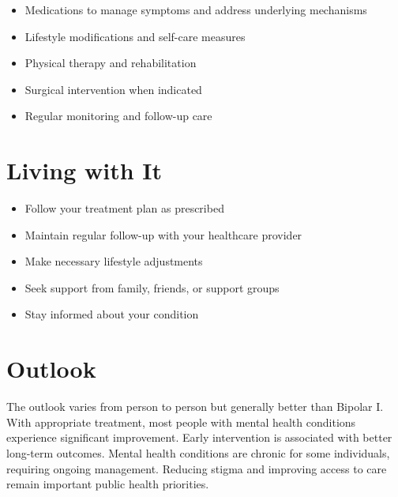 \begin{itemize}[noitemsep]
  \item Medications to manage symptoms and address underlying mechanisms
  \item Lifestyle modifications and self-care measures
  \item Physical therapy and rehabilitation
  \item Surgical intervention when indicated
  \item Regular monitoring and follow-up care
\end{itemize}
\section{Living with It}
\begin{itemize}[noitemsep]
  \item Follow your treatment plan as prescribed
  \item Maintain regular follow-up with your healthcare provider
  \item Make necessary lifestyle adjustments
  \item Seek support from family, friends, or support groups
  \item Stay informed about your condition
\end{itemize}
\section{Outlook}
The outlook varies from person to person but generally better than Bipolar I. With appropriate treatment, most people with mental health conditions experience significant improvement. Early intervention is associated with better long-term outcomes. Mental health conditions are chronic for some individuals, requiring ongoing management. Reducing stigma and improving access to care remain important public health priorities.
